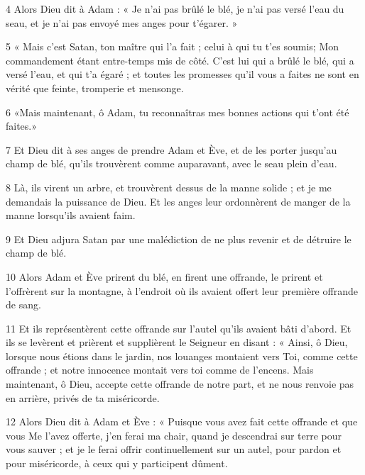 \par 4 Alors Dieu dit à Adam : « Je n'ai pas brûlé le blé, je n'ai pas versé l'eau du seau, et je n'ai pas envoyé mes anges pour t'égarer. »

\par 5 « Mais c'est Satan, ton maître qui l'a fait ; celui à qui tu t'es soumis; Mon commandement étant entre-temps mis de côté. C'est lui qui a brûlé le blé, qui a versé l'eau, et qui t'a égaré ; et toutes les promesses qu'il vous a faites ne sont en vérité que feinte, tromperie et mensonge.

\par 6 «Mais maintenant, ô Adam, tu reconnaîtras mes bonnes actions qui t'ont été faites.»

\par 7 Et Dieu dit à ses anges de prendre Adam et Ève, et de les porter jusqu'au champ de blé, qu'ils trouvèrent comme auparavant, avec le seau plein d'eau.

\par 8 Là, ils virent un arbre, et trouvèrent dessus de la manne solide ; et je me demandais la puissance de Dieu. Et les anges leur ordonnèrent de manger de la manne lorsqu'ils avaient faim.

\par 9 Et Dieu adjura Satan par une malédiction de ne plus revenir et de détruire le champ de blé.

\par 10 Alors Adam et Ève prirent du blé, en firent une offrande, le prirent et l'offrèrent sur la montagne, à l'endroit où ils avaient offert leur première offrande de sang.

\par 11 Et ils représentèrent cette offrande sur l'autel qu'ils avaient bâti d'abord. Et ils se levèrent et prièrent et supplièrent le Seigneur en disant : « Ainsi, ô Dieu, lorsque nous étions dans le jardin, nos louanges montaient vers Toi, comme cette offrande ; et notre innocence montait vers toi comme de l'encens. Mais maintenant, ô Dieu, accepte cette offrande de notre part, et ne nous renvoie pas en arrière, privés de ta miséricorde.

\par 12 Alors Dieu dit à Adam et Ève : « Puisque vous avez fait cette offrande et que vous Me l'avez offerte, j'en ferai ma chair, quand je descendrai sur terre pour vous sauver ; et je le ferai offrir continuellement sur un autel, pour pardon et pour miséricorde, à ceux qui y participent dûment.

